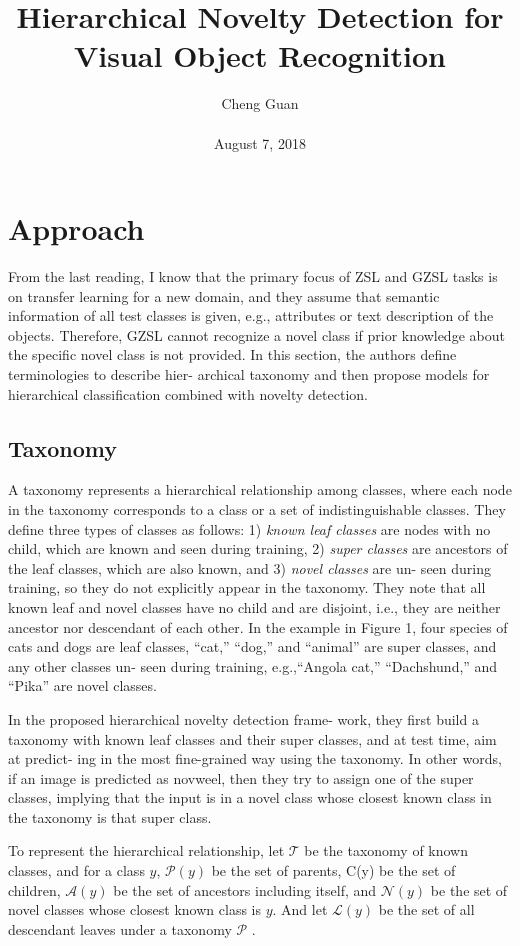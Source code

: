 \documentclass[10pt,twocolumn,letterpaper]{article}
\title{Hierarchical Novelty Detection for Visual Object Recognition}
\author{Cheng Guan\\\\
August 7, 2018}
\begin{document}
\maketitle
\section{Approach}
From the last reading, I know that the primary
focus of ZSL and GZSL tasks is on transfer learning for a
new domain, and they assume that semantic information of
all test classes is given, e.g., attributes  or text
description \cite{changpinyo2016synthesized,fu2016semi,frome2013devise,norouzi2013zero,reed2016learning} of the objects. Therefore,
GZSL cannot recognize a novel class if prior knowledge
about the specific novel class is not provided. In this section, the authors define terminologies to describe hier-
archical taxonomy and then propose models for hierarchical
classification combined with novelty detection.
\subsection{Taxonomy}
A taxonomy represents a hierarchical relationship
among classes, where each node in the taxonomy corresponds to a class or a set of indistinguishable classes. They define three types of classes as follows: 1) \textit{known leaf classes} are nodes with no child, which are known and seen during training, 2) \textit{super classes} are ancestors of the leaf classes, which are also known, and 3) \textit{novel classes} are un-
seen during training, so they do not explicitly appear in the taxonomy. They note that all known leaf and novel classes
have no child and are disjoint, i.e., they are neither ancestor
nor descendant of each other. In the example in Figure 1,
four species of cats and dogs are leaf classes, ``cat,'' ``dog,''
and “animal” are super classes, and any other classes un-
seen during training, e.g.,``Angola cat,'' ``Dachshund,'' and
``Pika'' are novel classes.
\par
In the proposed hierarchical novelty detection frame-
work, they first build a taxonomy with known leaf classes
and their super classes, and at test time,  aim at predict-
ing in the most fine-grained way using the taxonomy. In
other words, if an image is predicted as novweel, then they try
to assign one of the super classes, implying that the input is
in a novel class whose closest known class in the taxonomy
is that super class.
\par
To represent the hierarchical relationship, let $\mathcal{T}$ be the
taxonomy of known classes, and for a class $y$, $\mathcal{P}\left(y\right)$ be the
set of parents, C(y) be the set of children, $\mathcal{A}\left(y\right)$ be the set
of ancestors including itself, and $\mathcal{N}\left(y\right)$ be the set of novel
classes whose closest known class is $y$. And let $\mathcal{L}\left(y\right)$ be
the set of all descendant leaves under a taxonomy $\mathcal{P}$ .
\end{document}
